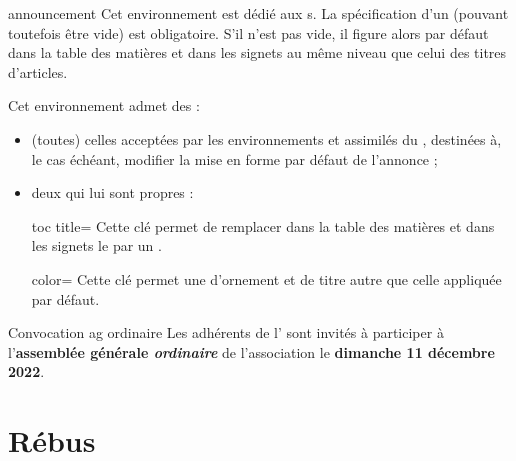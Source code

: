\documentclass{letgut}
\begin{document}
\begin{docEnvironment}[doclang/environment content=annonce,doc new and updated={2023-01-14}{2023-05-21}]{announcement}{}
  Cet environnement est dédié aux s. La spécification d'un
   (pouvant toutefois être vide) est obligatoire. S'il n'est pas
  vide, il figure alors par défaut dans la table des matières et dans les
  signets au même niveau que celui des titres d'articles.

  Cet environnement admet des  :
  \begin{itemize}
  \item (toutes) celles acceptées par les environnements  et
    assimilés du , destinées à, le cas échéant, modifier la
    mise en forme par défaut de l'annonce ;
  \item deux qui lui sont propres :
    \begin{docKey}[][doc new={2023-05-21}]{toc title}{=}{\valinitdef}
      Cette clé permet de remplacer dans la table des matières et dans les
      signets le  par un .
    \end{docKey}
    \begin{docKey}[][doc new={2023-05-21}]{color}{=}{}
      Cette clé permet une  d'ornement et de titre autre que celle
      appliquée par défaut.
    \end{docKey}
  \end{itemize}
\end{docEnvironment}

\begin{ltx-code-result}[title addon=annonces]
\begin{announcement}[toc title={Exemple d'annonce},color=red!35!black]{Convocation \acs{ag} ordinaire}
  Les adhérents de l'\assogut{} sont invités à participer à
  l'\textbf{assemblée générale \emph{ordinaire}} de l'association
  le \textbf{dimanche 11 décembre 2022}.
\end{announcement}
\end{ltx-code-result}

\section{Rébus}
\label{sec:rebus}
\end{document}

